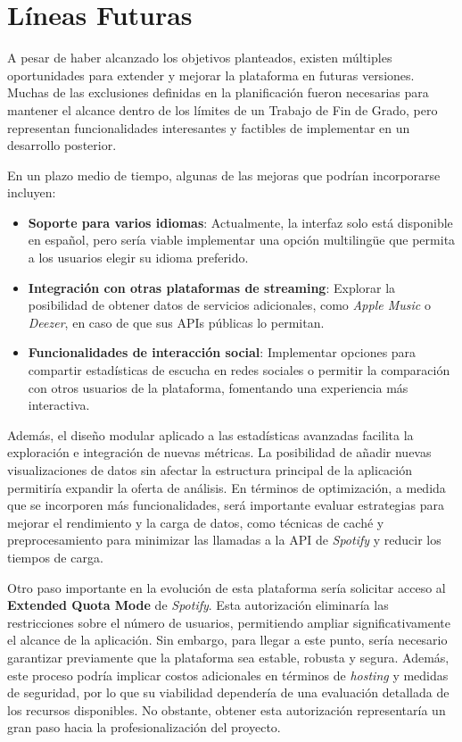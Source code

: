 \section{Líneas Futuras}

A pesar de haber alcanzado los objetivos planteados, existen múltiples oportunidades para extender y mejorar la plataforma en futuras versiones. Muchas de las exclusiones definidas en la planificación fueron necesarias para mantener el alcance dentro de los límites de un Trabajo de Fin de Grado, pero representan funcionalidades interesantes y factibles de implementar en un desarrollo posterior.

En un plazo medio de tiempo, algunas de las mejoras que podrían incorporarse incluyen:

\newpage

\begin{itemize}
    \item \textbf{Soporte para varios idiomas}: Actualmente, la interfaz solo está disponible en español, pero sería viable implementar una opción multilingüe que permita a los usuarios elegir su idioma preferido.
    \item \textbf{Integración con otras plataformas de streaming}: Explorar la posibilidad de obtener datos de servicios adicionales, como \textit{Apple Music} o \textit{Deezer}, en caso de que sus APIs públicas lo permitan.
    \item \textbf{Funcionalidades de interacción social}: Implementar opciones para compartir estadísticas de escucha en redes sociales o permitir la comparación con otros usuarios de la plataforma, fomentando una experiencia más interactiva.
\end{itemize}

Además, el diseño modular aplicado a las estadísticas avanzadas facilita la exploración e integración de nuevas métricas. La posibilidad de añadir nuevas visualizaciones de datos sin afectar la estructura principal de la aplicación permitiría expandir la oferta de análisis. En términos de optimización, a medida que se incorporen más funcionalidades, será importante evaluar estrategias para mejorar el rendimiento y la carga de datos, como técnicas de caché y preprocesamiento para minimizar las llamadas a la API de \textit{Spotify} y reducir los tiempos de carga.

Otro paso importante en la evolución de esta plataforma sería solicitar acceso al \textbf{Extended Quota Mode} de \textit{Spotify}. Esta autorización eliminaría las restricciones sobre el número de usuarios, permitiendo ampliar significativamente el alcance de la aplicación. Sin embargo, para llegar a este punto, sería necesario garantizar previamente que la plataforma sea estable, robusta y segura. Además, este proceso podría implicar costos adicionales en términos de \textit{hosting} y medidas de seguridad, por lo que su viabilidad dependería de una evaluación detallada de los recursos disponibles. No obstante, obtener esta autorización representaría un gran paso hacia la profesionalización del proyecto.

